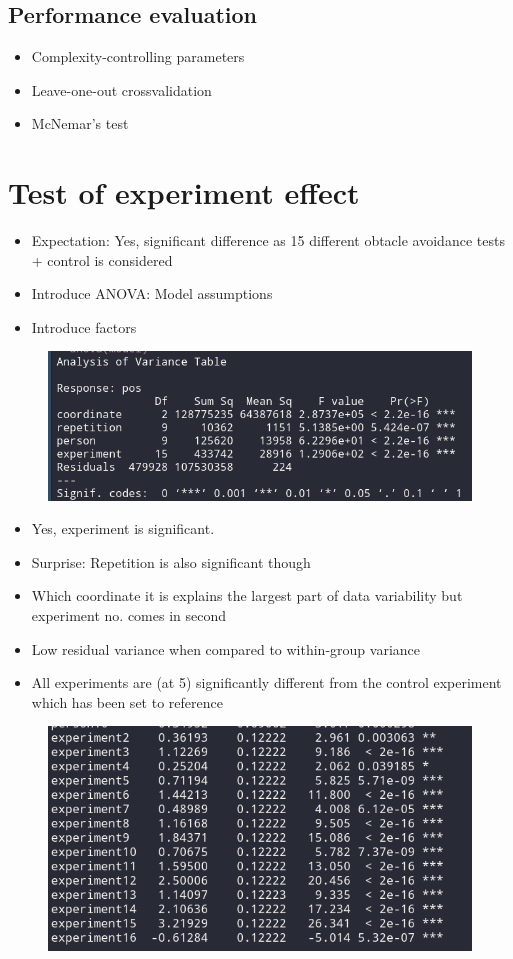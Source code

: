 \documentclass[12pt,fleqn]{article}
\begin{document}
\subsection{Performance evaluation}
\begin{itemize}
	\item Complexity-controlling parameters
	\item Leave-one-out crossvalidation
	\item McNemar's test
\end{itemize}
\section{Test of experiment effect}
\begin{itemize}
	\item Expectation: Yes, significant difference as 15 different obtacle avoidance tests + control is considered
\end{itemize}
\begin{itemize}
	\item Introduce ANOVA: Model assumptions
	\item Introduce factors
\end{itemize}
\begin{figure}[H]
	\centering
	\includegraphics[width=.7\linewidth]{p1_anova}
\end{figure}
\begin{itemize}
	\item Yes, experiment is significant. 
	\item Surprise: Repetition is also significant though
	\item Which coordinate it is explains the largest part of data variability but experiment no. comes in second
	\item Low residual variance when compared to within-group variance
	\item All experiments are (at 5\pro) significantly different from the control experiment which has been set to reference
\end{itemize}
\begin{figure}[H]
	\centering
	\includegraphics[width=.7\linewidth]{p1_anova_summay}
\end{figure}
\end{document}
